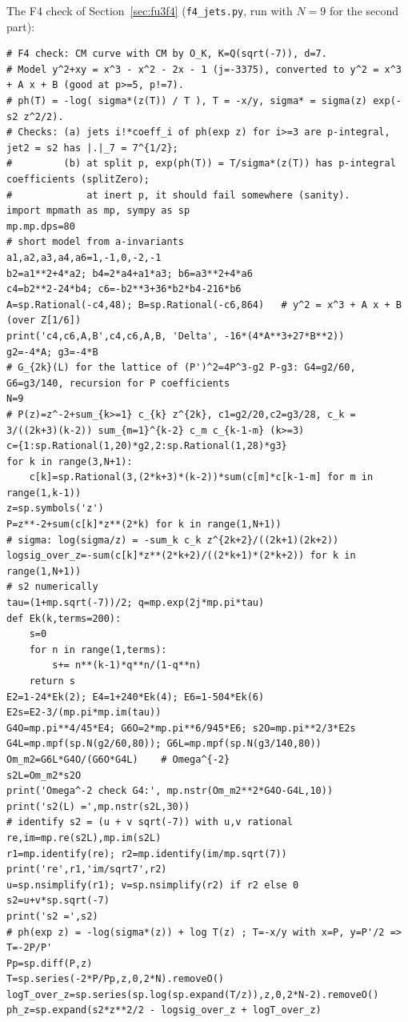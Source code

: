 \documentclass[11pt]{article}
\theoremstyle{remark}
\begin{document}
\noindent The F4 check of Section~\ref{sec:fu3f4} (\texttt{f4\_jets.py}, run with $N=9$ for the second part):
\begin{lstlisting}
# F4 check: CM curve with CM by O_K, K=Q(sqrt(-7)), d=7.
# Model y^2+xy = x^3 - x^2 - 2x - 1 (j=-3375), converted to y^2 = x^3 + A x + B (good at p>=5, p!=7).
# ph(T) = -log( sigma*(z(T)) / T ), T = -x/y, sigma* = sigma(z) exp(-s2 z^2/2).
# Checks: (a) jets i!*coeff_i of ph(exp z) for i>=3 are p-integral, jet2 = s2 has |.|_7 = 7^{1/2};
#         (b) at split p, exp(ph(T)) = T/sigma*(z(T)) has p-integral coefficients (splitZero);
#             at inert p, it should fail somewhere (sanity).
import mpmath as mp, sympy as sp
mp.mp.dps=80
# short model from a-invariants
a1,a2,a3,a4,a6=1,-1,0,-2,-1
b2=a1**2+4*a2; b4=2*a4+a1*a3; b6=a3**2+4*a6
c4=b2**2-24*b4; c6=-b2**3+36*b2*b4-216*b6
A=sp.Rational(-c4,48); B=sp.Rational(-c6,864)   # y^2 = x^3 + A x + B  (over Z[1/6])
print('c4,c6,A,B',c4,c6,A,B, 'Delta', -16*(4*A**3+27*B**2))
g2=-4*A; g3=-4*B
# G_{2k}(L) for the lattice of (P')^2=4P^3-g2 P-g3: G4=g2/60, G6=g3/140, recursion for P coefficients
N=9
# P(z)=z^-2+sum_{k>=1} c_{k} z^{2k}, c1=g2/20,c2=g3/28, c_k = 3/((2k+3)(k-2)) sum_{m=1}^{k-2} c_m c_{k-1-m} (k>=3)
c={1:sp.Rational(1,20)*g2,2:sp.Rational(1,28)*g3}
for k in range(3,N+1):
    c[k]=sp.Rational(3,(2*k+3)*(k-2))*sum(c[m]*c[k-1-m] for m in range(1,k-1))
z=sp.symbols('z')
P=z**-2+sum(c[k]*z**(2*k) for k in range(1,N+1))
# sigma: log(sigma/z) = -sum_k c_k z^{2k+2}/((2k+1)(2k+2))
logsig_over_z=-sum(c[k]*z**(2*k+2)/((2*k+1)*(2*k+2)) for k in range(1,N+1))
# s2 numerically
tau=(1+mp.sqrt(-7))/2; q=mp.exp(2j*mp.pi*tau)
def Ek(k,terms=200):
    s=0
    for n in range(1,terms):
        s+= n**(k-1)*q**n/(1-q**n)
    return s
E2=1-24*Ek(2); E4=1+240*Ek(4); E6=1-504*Ek(6)
E2s=E2-3/(mp.pi*mp.im(tau))
G4O=mp.pi**4/45*E4; G6O=2*mp.pi**6/945*E6; s2O=mp.pi**2/3*E2s
G4L=mp.mpf(sp.N(g2/60,80)); G6L=mp.mpf(sp.N(g3/140,80))
Om_m2=G6L*G4O/(G6O*G4L)    # Omega^{-2}
s2L=Om_m2*s2O
print('Omega^-2 check G4:', mp.nstr(Om_m2**2*G4O-G4L,10))
print('s2(L) =',mp.nstr(s2L,30))
# identify s2 = (u + v sqrt(-7)) with u,v rational
re,im=mp.re(s2L),mp.im(s2L)
r1=mp.identify(re); r2=mp.identify(im/mp.sqrt(7))
print('re',r1,'im/sqrt7',r2)
u=sp.nsimplify(r1); v=sp.nsimplify(r2) if r2 else 0
s2=u+v*sp.sqrt(-7)
print('s2 =',s2)
# ph(exp z) = -log(sigma*(z)) + log T(z) ; T=-x/y with x=P, y=P'/2 => T=-2P/P'
Pp=sp.diff(P,z)
T=sp.series(-2*P/Pp,z,0,2*N).removeO()
logT_over_z=sp.series(sp.log(sp.expand(T/z)),z,0,2*N-2).removeO()
ph_z=sp.expand(s2*z**2/2 - logsig_over_z + logT_over_z)

\end{lstlisting}
\end{document}
